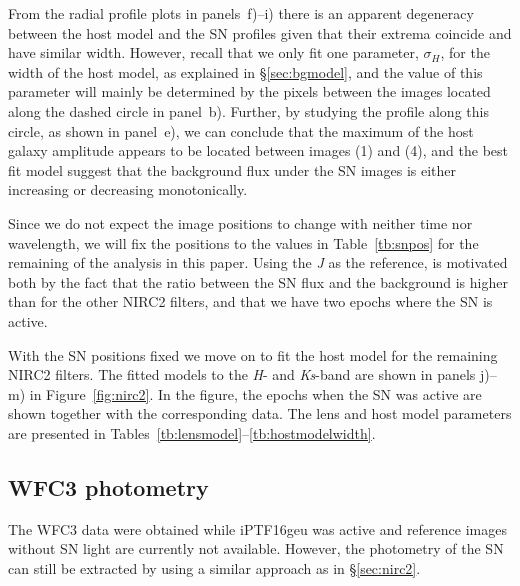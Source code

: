 \documentclass[a4paper,fleqn,usenatbib]{mnras}
\newcommand{\geu}{iPTF16geu\xspace}
\newcommand{\sn}{SN\xspace}
\newcommand{\wfc}{WFC3\xspace}
\newcommand{\jband}{{\it J}\xspace}
\newcommand{\hband}{{\it H}\xspace}
\newcommand{\ksband}{{\it Ks}\xspace}
\begin{document}
From the radial profile plots in panels~f)--i) there is an apparent degeneracy between the host model and the \sn profiles given 
that their extrema coincide and have similar width.  However, recall that we only fit one parameter, $\sigma_H$, for the width of 
the host model, as explained in \S\ref{sec:bgmodel}, and the value of this parameter will mainly be determined by the pixels 
between the images located along the dashed circle in panel~b).  Further, by studying the profile along this circle, as shown in 
panel~e), we can conclude that the maximum of the host galaxy amplitude appears to be located between images (1) and (4),  
and the best fit model suggest that the background flux under the \sn images is either increasing or decreasing monotonically.

Since we do not expect the image positions to change with neither time nor wavelength, we will fix the positions to the 
values in Table~\ref{tb:snpos} for the remaining of the analysis in this paper.  Using the \jband as the reference, is motivated 
both by the fact that the ratio between the \sn flux and the background is higher than for the other NIRC2 filters, and that we 
have two epochs where the \sn is active.

With the \sn positions fixed we move on to fit the host model for the remaining NIRC2 filters.  The fitted models to the 
\hband- and \ksband-band are shown in panels j)--m) in Figure~\ref{fig:nirc2}.  In the figure, the epochs when the \sn was 
active are shown together with the corresponding data.  The lens and host model parameters are presented in 
Tables~\ref{tb:lensmodel}--\ref{tb:hostmodelwidth}.  





\subsection{WFC3 photometry}
The \wfc data were obtained while \geu was active and reference images without \sn light are currently not available.   
However, the photometry of the \sn can still be extracted by using a similar approach as in \S\ref{sec:nirc2}.  
\end{document}
